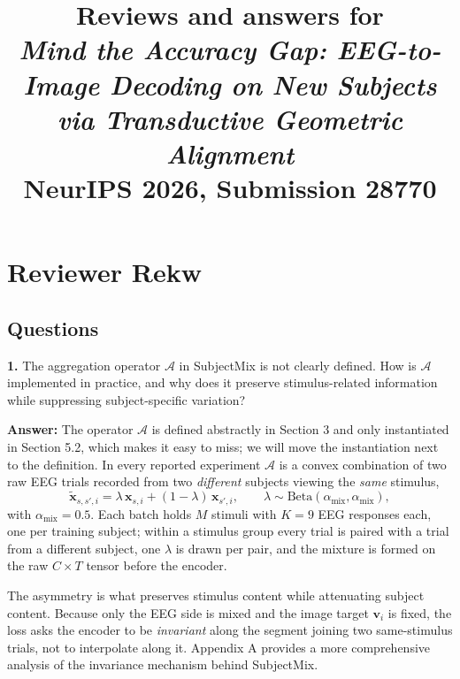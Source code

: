 \documentclass[11pt]{article}
\title{Reviews and answers for \\ \emph{Mind the Accuracy Gap: EEG-to-Image Decoding on New Subjects \\ via Transductive Geometric Alignment} \\ {\normalsize NeurIPS 2026, Submission 28770}}
\author{}
\date{}
\newcommand{\answer}[1]{{\textbf{Answer:} \color{blue} #1}}
\begin{document}
\maketitle

\section{Reviewer Rekw}

\subsection{Questions}

\textbf{1.} The aggregation operator $\mathcal{A}$ in SubjectMix is not clearly defined. How is
$\mathcal{A}$ implemented in practice, and why does it preserve stimulus-related information while
suppressing subject-specific variation?

\answer{
The operator $\mathcal{A}$ is defined abstractly in Section 3 and only instantiated in Section 5.2,
which makes it easy to miss; we will move the instantiation next to the definition. In every reported
experiment $\mathcal{A}$ is a convex combination of two raw EEG trials recorded from two
\emph{different} subjects viewing the \emph{same} stimulus,
\[
\widetilde{\mathbf{x}}_{s,s',i} = \lambda\,\mathbf{x}_{s,i} + (1-\lambda)\,\mathbf{x}_{s',i},
\qquad \lambda \sim \mathrm{Beta}(\alpha_{\mathrm{mix}}, \alpha_{\mathrm{mix}}),
\]
with $\alpha_{\mathrm{mix}} = 0.5$. Each batch holds $M$ stimuli with $K = 9$ EEG responses each, one per training
subject; within a stimulus group every trial is paired with a trial from a different subject, one
$\lambda$ is drawn per pair, and the mixture is formed on the raw $C \times T$ tensor before the encoder.

The asymmetry is what preserves stimulus content while attenuating subject content. Because only the EEG side is mixed and the image target $\mathbf{v}_i$ is fixed, the loss asks the encoder to be \emph{invariant} along the segment joining two same-stimulus trials, not to interpolate along it. Appendix A provides a more comprehensive analysis of the invariance mechanism behind SubjectMix.

}
\end{document}
